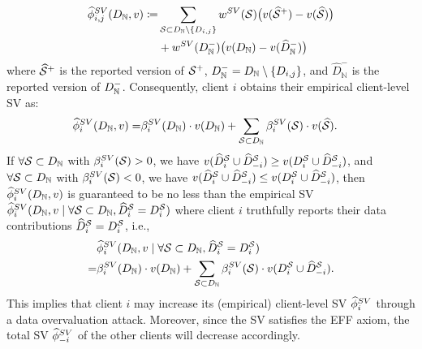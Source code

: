 \begin{align*}
    \empiricalsv_{i,j}(\granddataset, v)\coloneqq & \sum_{\datasubset\subset \granddataset \setminus \set[D_{i,j}]} \weightsv(\datasubset) \big(v(\reportedsubset^{+})  - v(\reportedsubset)\big) \\
    & + \weightsv(\granddataset^{-}) \big(v(\granddataset)  - v(\widehat{D}_{\mathbb{N}}^{-})\big)
\end{align*}
where $\reportedsubset^{+}$ is the reported version of $\datasubset^{+}$, $\granddataset^{-} = \granddataset \setminus \{D_{i,j}\}$, and $\widehat{D}_{\mathbb{N}}^{-}$ is the reported version of $\granddataset^{-}$.
Consequently, client $i$ obtains their empirical client-level SV as:
\vspace{-3pt}
\begin{align*}
    \empiricalsv_{i}(\granddataset, v) = & \betasv(\granddataset) \cdot v(\granddataset) + \sum_{\datasubset\subset \granddataset} \betasv(\datasubset) \cdot v(\reportedsubset).
\end{align*}
If $\forall \datasubset \subset \granddataset$ with $\betasv(\datasubset) > 0$, we have $v(\reportedstoi \cup \reportedstominusi) \geq v(\stoi \cup \reportedstominusi)$, and $\forall \datasubset \subset \granddataset$ with $\betasv(\datasubset) < 0$, we have $v(\reportedstoi \cup \reportedstominusi) \leq v(\stoi \cup \reportedstominusi)$, then $\empiricalsv_{i}(\granddataset, v)$ is guaranteed to be no less than the empirical SV $\empiricalsv_i(\granddataset, v \mid \forall \datasubset \subset \granddataset, \reportedstoi =  \stoi)$ where client $i$ truthfully reports their data contributions $\reportedstoi = \stoi$, i.e.,
\begin{align*}
     &\empiricalsv_{i}(\granddataset, v \mid \forall \datasubset \subset \granddataset, \reportedstoi =  \stoi) \\
    = & \betasv(\granddataset) \cdot v(\granddataset) + \sum_{\datasubset\subset \granddataset} \betasv(\datasubset) \cdot v(\stoi \cup \reportedstominusi).
\end{align*}
This implies that client $i$ may increase its (empirical) client-level SV $\empiricalsv_{i}$ through a data overvaluation attack. 
Moreover, since the SV satisfies the EFF axiom, the total SV $\empiricalsv_{-i}$ of the other clients will decrease accordingly.

